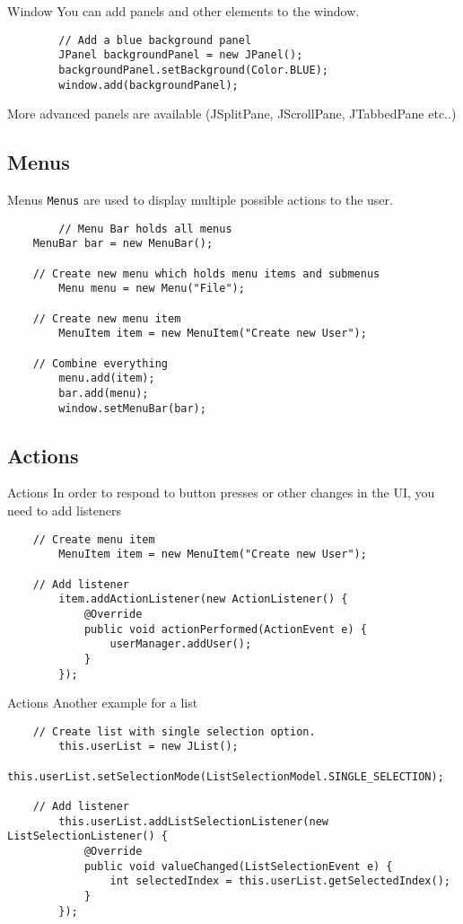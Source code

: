 \begin{frame}[fragile]{Window}
  You can add panels and other elements to the window.
    \begin{lstlisting}
        // Add a blue background panel
        JPanel backgroundPanel = new JPanel();
        backgroundPanel.setBackground(Color.BLUE);
        window.add(backgroundPanel);\end{lstlisting}

  More advanced panels are available (JSplitPane, JScrollPane, JTabbedPane etc..)
\end{frame}

\subsection{Menus}
\begin{frame}[fragile]{Menus}
  \texttt{Menus} are used to display multiple possible actions to the user.
    \begin{lstlisting}
        // Menu Bar holds all menus
    MenuBar bar = new MenuBar();
    
    // Create new menu which holds menu items and submenus
        Menu menu = new Menu("File");

    // Create new menu item 
        MenuItem item = new MenuItem("Create new User");
    
    // Combine everything
        menu.add(item);
        bar.add(menu);
        window.setMenuBar(bar);\end{lstlisting}
\end{frame}

\subsection{Actions}
\begin{frame}[fragile]{Actions}
  In order to respond to button presses or other changes in the UI, you need to add listeners
    \begin{lstlisting}
    // Create menu item
        MenuItem item = new MenuItem("Create new User");
  
    // Add listener
        item.addActionListener(new ActionListener() {
            @Override
            public void actionPerformed(ActionEvent e) {
                userManager.addUser();
            }
        });\end{lstlisting}
\end{frame}
    
\begin{frame}[fragile]{Actions}
  Another example for a list
    \begin{lstlisting}
    // Create list with single selection option.
        this.userList = new JList();
        this.userList.setSelectionMode(ListSelectionModel.SINGLE_SELECTION);
      
    // Add listener
        this.userList.addListSelectionListener(new ListSelectionListener() {
            @Override
            public void valueChanged(ListSelectionEvent e) {
                int selectedIndex = this.userList.getSelectedIndex();
            }
        });\end{lstlisting}
\end{frame}
